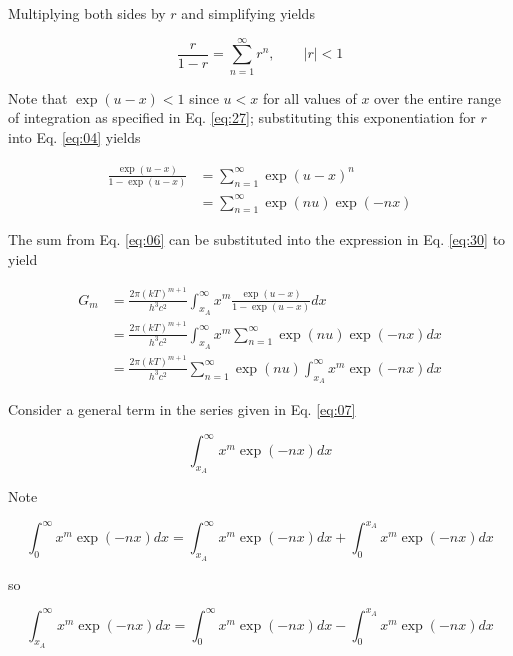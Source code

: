 \documentclass[letterpaper,12pt]{article}
\begin{document}
\noindent Multiplying both sides by $r$ and simplifying yields

\begin{equation} \label{eq:04}
\frac{r}{1-r} = \sum_{n = 1}^{\infty} r^{n}, \qquad |r| < 1
\end{equation}


Note that $\exp(u-x) < 1$ since $u < x$ for all values of $x$ over the entire range of integration as specified in Eq. \ref{eq:27}; substituting this exponentiation for $r$ into Eq. \ref{eq:04} yields

\begin{align} \label{eq:06}
\frac{\exp(u-x)}{1 - \exp(u-x)} &= \sum_{n = 1}^{\infty} \exp(u-x)^{n} \nonumber \\
 &= \sum_{n = 1}^{\infty} \exp(nu) \exp(-nx)
\end{align}


The sum from Eq. \ref{eq:06} can be substituted into the expression in Eq. \ref{eq:30} to yield

\begin{align} \label{eq:07}
G_{m} &= \frac{2\pi (kT)^{m+1}}{h^{3} c^{2}} \int_{x_{A}}^{\infty} x^{m} \frac{\exp(u-x)}{1 - \exp(u-x)} dx \nonumber \\
 &= \frac{2\pi (kT)^{m+1}}{h^{3} c^{2}} \int_{x_{A}}^{\infty} x^{m} \sum_{n = 1}^{\infty} \exp(nu) \exp(-nx) dx \nonumber \\
 &= \frac{2\pi (kT)^{m+1}}{h^{3} c^{2}} \sum_{n = 1}^{\infty} \exp(nu) \int_{x_{A}}^{\infty} x^{m} \exp(-nx) dx
\end{align}

Consider a general term in the series given in Eq. \ref{eq:07}

\begin{equation} \label{eq:08}
\int_{x_{A}}^{\infty} x^{m} \exp(-nx) dx
\end{equation}

\noindent Note

\begin{equation} \label{eq:09}
\int_{0}^{\infty} x^{m} \exp(-nx) dx = \int_{x_{A}}^{\infty} x^{m} \exp(-nx) dx + \int_{0}^{x_{A}} x^{m} \exp(-nx) dx
\end{equation}

\noindent so

\begin{equation} \label{eq:10}
\int_{x_{A}}^{\infty} x^{m} \exp(-nx) dx = \int_{0}^{\infty} x^{m} \exp(-nx) dx - \int_{0}^{x_{A}} x^{m} \exp(-nx) dx
\end{equation}
\end{document}
